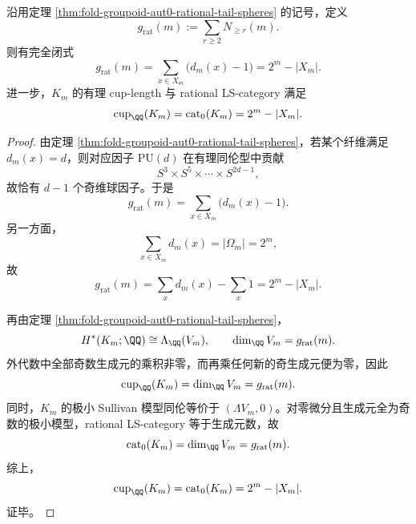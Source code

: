 \begin{theorem}\label{thm:fold-groupoid-aut0-rational-generator-gap}
沿用定理 \ref{thm:fold-groupoid-aut0-rational-tail-spheres} 的记号，定义
\[
g_{\mathrm{rat}}(m):=\sum_{r\ge 2}N_{\ge r}(m).
\]
则有完全闭式
\[
g_{\mathrm{rat}}(m)=\sum_{x\in X_m}\bigl(d_m(x)-1\bigr)=2^m-|X_m|.
\]
进一步，\(K_m\) 的有理 cup-length 与 rational LS-category 满足
\[
\operatorname{cup}_{\QQ}(K_m)=\operatorname{cat}_0(K_m)=2^m-|X_m|.
\]
\end{theorem}
\begin{proof}
由定理 \ref{thm:fold-groupoid-aut0-rational-tail-spheres}，若某个纤维满足 \(d_m(x)=d\)，则对应因子 \(\mathrm{PU}(d)\) 在有理同伦型中贡献
\[
S^3\times S^5\times\cdots\times S^{2d-1},
\]
故恰有 \(d-1\) 个奇维球因子。于是
\[
g_{\mathrm{rat}}(m)=\sum_{x\in X_m}\bigl(d_m(x)-1\bigr).
\]
另一方面，
\[
\sum_{x\in X_m}d_m(x)=|\Omega_m|=2^m,
\]
故
\[
g_{\mathrm{rat}}(m)=\sum_x d_m(x)-\sum_x1=2^m-|X_m|.
\]

再由定理 \ref{thm:fold-groupoid-aut0-rational-tail-spheres}，
\[
H^\ast(K_m;\QQ)\cong \Lambda_{\QQ}(V_m),
\qquad
\dim_{\QQ}V_m=g_{\mathrm{rat}}(m).
\]
外代数中全部奇数生成元的乘积非零，而再乘任何新的奇生成元便为零，因此
\[
\operatorname{cup}_{\QQ}(K_m)=\dim_{\QQ}V_m=g_{\mathrm{rat}}(m).
\]
同时，\(K_m\) 的极小 Sullivan 模型同伦等价于 \((\Lambda V_m,0)\)。对零微分且生成元全为奇数的极小模型，rational LS-category 等于生成元数，故
\[
\operatorname{cat}_0(K_m)=\dim_{\QQ}V_m=g_{\mathrm{rat}}(m).
\]
综上，
\[
\operatorname{cup}_{\QQ}(K_m)=\operatorname{cat}_0(K_m)=2^m-|X_m|.
\]
证毕。
\end{proof}

